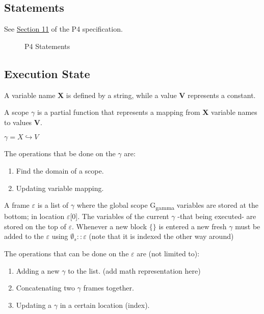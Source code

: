 \documentclass[UTF8]{article}
\begin{document}
\newpage
\subsection{Statements}
\newcommand{\stmt}{\textit{stmt}}
\label{ssec:stmt}
See \href{https://p4.org/p4-spec/docs/P4-16-v1.2.1.html#sec-stmts}{Section 11} of the P4 specification.

\begin{figure}[h!]
\centering\ottgrammartabular{
\ottstmt\ottafterlastrule
}
\caption{P4 Statements}
\label{fig:stmt}
\end{figure}

\newpage
\newcommand{\state}{\Sigma}
\newcommand{\scope}{\ensuremath{\mathit{scope}}}
\newcommand{\stacks}{\sigma}
\newcommand{\currsf}{\ensuremath{\varepsilon}}
\newcommand{\gscope}{\ensuremath{\currsf [0] }}
\newcommand{\cstack}{E}
\newcommand{\status}{\textit{status}}
\subsection{Execution State}
A variable name \textbf{X} is defined by a string, while a value \textbf{V} represents a constant.

A scope $\gamma$ is a partial function that represents a mapping from \textbf{X} variable names to values \textbf{V}.

$\gamma = X \hookrightarrow V$

The operations that be done on the $\gamma$ are:
\begin{enumerate}
\item Find the domain of a scope.
\item Updating variable mapping.
\end{enumerate}

A frame $\currsf$ is a list of $\gamma$ where the global scope G\textsubscript{gamma} variables are stored at the bottom; in location $\currsf$[0]. The variables of the current $\gamma$ -that being executed- are stored on the top of $\currsf$. Whenever a new block $\{ \}$ is entered a new fresh $\gamma$ must be added to the $\currsf$ using $ \emptyset _{s}:: \currsf$ (note that it is indexed the other way around)

The operations that can be done on the $\currsf$ are (not limited to):
\begin{enumerate}
\item Adding a new $\gamma$ to the list. (add math representation here)
\item Concatenating two $\gamma$ frames together.
\item Updating a $\gamma$ in a certain location (index).
\end{enumerate}
\end{document}
